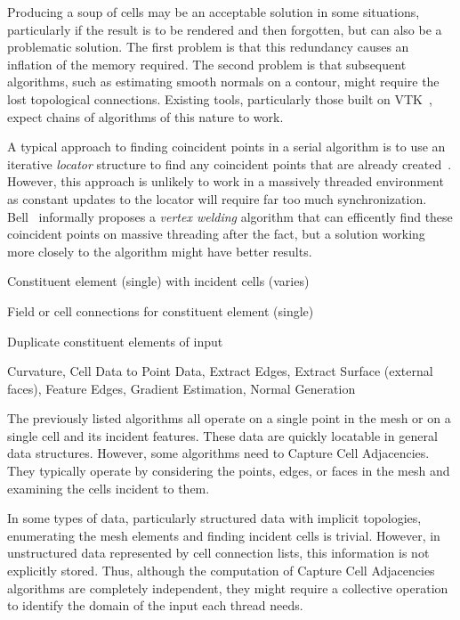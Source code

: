 \documentclass{sig-alternate}
\newcommand*{\lcite}[1]{~\cite{#1}}
\newcommand*{\scite}[1]{~\cite{#1}}
\newcommand*{\keyterm}[1]{\emph{#1}}
\newcommand{\algclass}[1]{\textsf{#1}}
\newcommand{\algorithmclasssection}[1]{
  \vspace{\baselineskip}\noindent{\large\textbf{\algclass{#1}}}}
\newcommand{\algorithmclass}[5]{
  \algorithmclasssection{#1} %
  \vspace{-.4\baselineskip}
  \begin{description}[leftmargin=9em,style=nextline,noitemsep]
    \raggedright
  \item[Input] #2
  \item[Output] #3
  \item[Interdependence] #4
  \item[Algorithms] #5
  \end{description}
}
\begin{document}
Producing a soup of cells may be an acceptable solution in some situations,
particularly if the result is to be rendered and then forgotten, but can
also be a problematic solution. The first problem is that this redundancy
causes an inflation of the memory required. The second problem is that
subsequent algorithms, such as estimating smooth normals on a contour,
might require the lost topological connections. Existing tools,
particularly those built on VTK\lcite{VTK}, expect chains of algorithms of
this nature to work.

A typical approach to finding coincident points in a serial algorithm is to
use an iterative \keyterm{locator} structure to find any coincident points
that are already created\lcite{VTKUsersGuide}. However, this approach is
unlikely to work in a massively threaded environment as constant updates to
the locator will require far too much synchronization. Bell\scite{Bell2010}
informally proposes a \keyterm{vertex welding} algorithm that can
efficently find these coincident points on massive threading after the
fact, but a solution working more closely to the algorithm might have
better results.


\algorithmclass{Capture Cell Adjacencies}
               {Constituent element (single) with incident cells (varies)} %
               {Field or cell connections for constituent element (single)} %
               {Duplicate constituent elements of input} %
               {Curvature, Cell Data to Point Data, Extract Edges, Extract
                 Surface (external faces), Feature Edges, Gradient
                 Estimation, Normal Generation}

\noindent
The previously listed algorithms all operate on a single point in the mesh
or on a single cell and its incident features. These data are quickly
locatable in general data structures. However, some algorithms need to
\algclass{Capture Cell Adjacencies}. They typically operate by considering
the points, edges, or faces in the mesh and examining the cells incident to
them.

In some types of data, particularly structured data with implicit
topologies, enumerating the mesh elements and finding incident cells is
trivial. However, in unstructured data represented by cell connection
lists, this information is not explicitly stored. Thus, although the
computation of \algclass{Capture Cell Adjacencies} algorithms are
completely independent, they might require a collective operation to
identify the domain of the input each thread needs.
\end{document}
